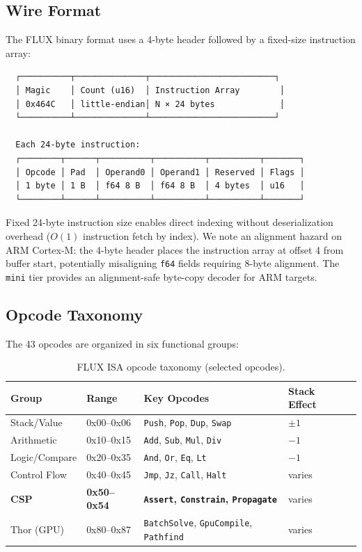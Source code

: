 \documentclass[sigplan,10pt,review]{acmart}
\begin{document}
\subsection{Wire Format}

The FLUX binary format uses a 4-byte header followed by a fixed-size instruction array:
\begin{verbatim}
  ┌──────────┬──────────────┬─────────────────────────┐
  │ Magic    │ Count (u16)  │ Instruction Array        │
  │ 0x464C   │ little-endian│ N × 24 bytes             │
  └──────────┴──────────────┴─────────────────────────┘

  Each 24-byte instruction:
  ┌────────┬──────┬──────────┬──────────┬──────────┬───────┐
  │ Opcode │ Pad  │ Operand0 │ Operand1 │ Reserved │ Flags │
  │ 1 byte │ 1 B  │ f64 8 B  │ f64 8 B  │ 4 bytes  │ u16   │
  └────────┴──────┴──────────┴──────────┴──────────┴───────┘
\end{verbatim}

Fixed 24-byte instruction size enables direct indexing without deserialization
overhead ($O(1)$ instruction fetch by index). We note an alignment hazard on
ARM Cortex-M: the 4-byte header places the instruction array at offset 4 from
buffer start, potentially misaligning \texttt{f64} fields requiring 8-byte
alignment. The \texttt{mini} tier provides an alignment-safe byte-copy decoder
for ARM targets.

\subsection{Opcode Taxonomy}

The 43 opcodes are organized in six functional groups:

\begin{table}[h]
\centering
\caption{FLUX ISA opcode taxonomy (selected opcodes).}
\label{tab:opcodes}
\renewcommand{\arraystretch}{1.15}
\begin{tabular}{lllll}
\toprule
\textbf{Group} & \textbf{Range} & \textbf{Key Opcodes} & \textbf{Stack Effect} \\
\midrule
Stack/Value  & 0x00--0x06 & \texttt{Push}, \texttt{Pop}, \texttt{Dup}, \texttt{Swap} & $\pm1$ \\
Arithmetic   & 0x10--0x15 & \texttt{Add}, \texttt{Sub}, \texttt{Mul}, \texttt{Div} & $-1$ \\
Logic/Compare& 0x20--0x35 & \texttt{And}, \texttt{Or}, \texttt{Eq}, \texttt{Lt} & $-1$ \\
Control Flow & 0x40--0x45 & \texttt{Jmp}, \texttt{Jz}, \texttt{Call}, \texttt{Halt} & varies \\
\textbf{CSP} & \textbf{0x50--0x54} & \textbf{\texttt{Assert}, \texttt{Constrain}, \texttt{Propagate}} & varies \\
Thor (GPU)   & 0x80--0x87 & \texttt{BatchSolve}, \texttt{GpuCompile}, \texttt{Pathfind} & varies \\
\bottomrule
\end{tabular}
\end{table}
\end{document}
